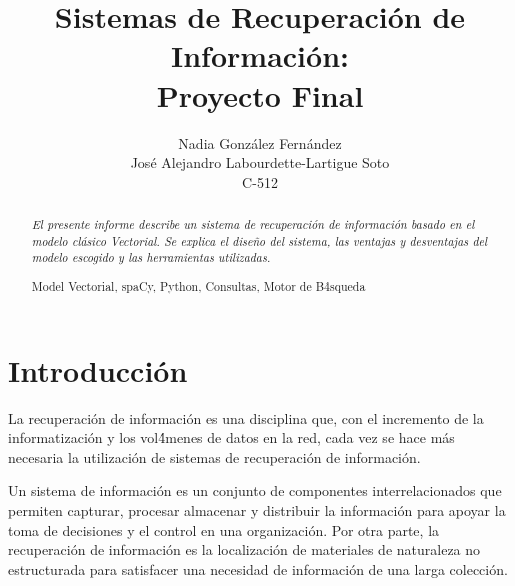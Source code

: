 \documentclass[runningheads,a4paper]{llncs}
\newcommand{\keywords}[1]{\par\addvspace\baselineskip
\noindent\keywordname\enspace\ignorespaces#1}
\begin{document}
\mainmatter  

\title{Sistemas de Recuperaci\'on de Informaci\'on:\\Proyecto Final}



\author{Nadia Gonz\'alez Fern\'andez \\ Jos\'e Alejandro Labourdette-Lartigue Soto\\ C-512}





\maketitle


\begin{abstract}
\emph{El presente informe describe un sistema de recuperaci\'on de informaci\'on basado en el modelo cl\'asico Vectorial. Se explica el diseño del sistema, las ventajas y desventajas del modelo escogido y las herramientas utilizadas.}
\keywords{Model Vectorial, spaCy, Python, Consultas, Motor de B\'4squeda}
\end{abstract}


\section{Introducci\'on}\label{sec:introducci\'on}
La recuperaci\'on de informaci\'on es una disciplina que, con el incremento de la informatizaci\'on y los vol\'4menes de datos en la red, cada vez se hace m\'as necesaria la utilizaci\'on de sistemas de recuperaci\'on de informaci\'on.

Un sistema de informaci\'on es un conjunto de componentes interrelacionados que permiten capturar, procesar almacenar y distribuir la informaci\'on para apoyar la toma de decisiones y el control en una organizaci\'on.
Por otra parte, la recuperaci\'on de informaci\'on es la localizaci\'on de materiales de naturaleza no estructurada para satisfacer una necesidad de informaci\'on de una larga colecci\'on.
\end{document}
